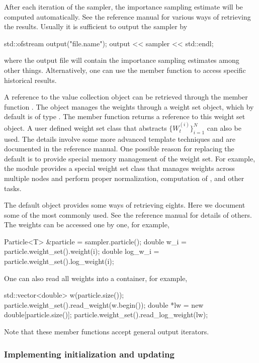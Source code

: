 \documentclass[11pt, fontset=Minion, showoverfull,
bib, mintcode, minted=cache]{marticle}
\begin{document}
After each iteration of the sampler, the importance sampling estimate will be
computed automatically. See the reference manual for various ways of
retrieving the results. Usually it is sufficient to output the sampler by
\begin{cppcode}
std::ofstream output("file.name");
output << sampler << std::endl;
\end{cppcode}
where the output file will contain the importance sampling estimates among
other things. Alternatively, one can use the 
member function to access specific historical results.

A reference to the value collection  object can be retrieved
through the member function . The
 object manages the weights through a weight set
object, which by default is of type . The
 member function returns a reference to
this weight set object. A user defined weight set class that abstracts
$\{W_t^{(i)}\}_{i=1}^N$ can also be used. The details involve some more
advanced \cpp template techniques and are documented in the reference manual.
One possible reason for replacing the default is to provide special memory
management of the weight set. For example, the \lmpi module provides a special
weight set class that manages weights across multiple nodes and perform proper
normalization, computation of \ess, and other tasks.

The default  object provides some ways of retrieving
eights. Here we document some of the most commonly used. See the reference
manual for details of others. The weights can be accessed one by one, for
example,
\begin{cppcode}
Particle<T> &particle = sampler.particle();
double w_i     = particle.weight_set().weight(i);
double log_w_i = particle.weight_set().log_weight(i);
\end{cppcode}
One can also read all weights into a container, for example,
\begin{cppcode}
std::vector<double> w(particle.size());
particle.weight_set().read_weight(w.begin());
double *lw = new double[particle.size()];
particle.weight_set().read_log_weight(lw);
\end{cppcode}
Note that these member functions accept general output iterators.

\subsubsection{Implementing initialization and updating}
\end{document}
